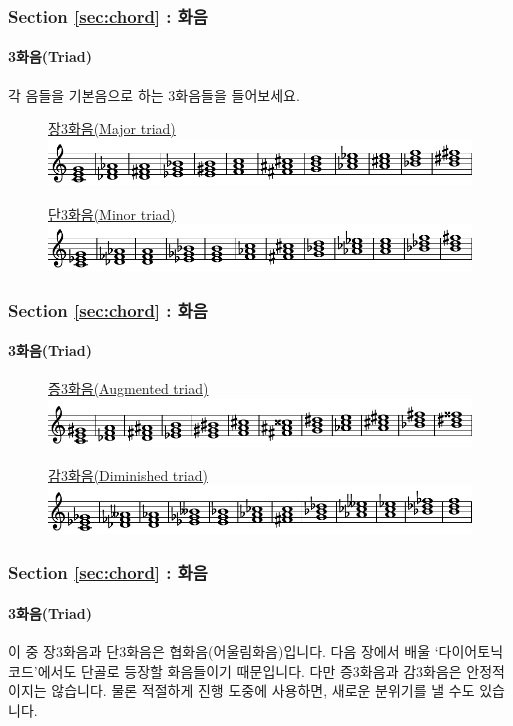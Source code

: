 \documentclass{beamer}
\begin{document}
	\begin{frame}
		\frametitle{Section \ref{sec:chord} : 화음}
		\framesubtitle{3화음(Triad)}
		각 음들을 기본음으로 하는 3화음들을 들어보세요.
		\begin{figure}
			\centering
			\color{cyan}\href{run:res/mp3/9/scale/chromatic_major_chord.mp3}{장3화음(Major triad)}
			\includegraphics[width=\textwidth]{res/pdf/9/scale/major.pdf}
		\end{figure}
		\begin{figure}
			\centering
			\color{cyan}\href{run:res/mp3/9/scale/chromatic_minor_chord.mp3}{단3화음(Minor triad)}
			\includegraphics[width=\textwidth]{res/pdf/9/scale/minor.pdf}
		\end{figure}
	\end{frame}
	
	\begin{frame}
		\frametitle{Section \ref{sec:chord} : 화음}
		\framesubtitle{3화음(Triad)}
		\begin{figure}
			\centering
			\color{cyan}\href{run:res/mp3/9/scale/chromatic_augmented_chord.mp3}{증3화음(Augmented triad)}
			\includegraphics[width=\textwidth]{res/pdf/9/scale/augmented.pdf}
		\end{figure}
		\begin{figure}
			\centering
			\color{cyan}\href{run:res/mp3/9/scale/chromatic_diminished_chord.mp3}{감3화음(Diminished triad)}
			\includegraphics[width=\textwidth]{res/pdf/9/scale/diminished.pdf}
		\end{figure}
	\end{frame}
	
	\begin{frame}
		\frametitle{Section \ref{sec:chord} : 화음}
		\framesubtitle{3화음(Triad)}
		이 중 장3화음과 단3화음은 협화음(어울림화음)입니다. 다음 장에서 배울 `다이어토닉 코드'에서도 단골로 등장할 화음들이기 때문입니다. 다만 증3화음과 감3화음은 안정적이지는 않습니다. 물론 적절하게 진행 도중에 사용하면, 새로운 분위기를 낼 수도 있습니다. 
	\end{frame}
	
\end{document}
